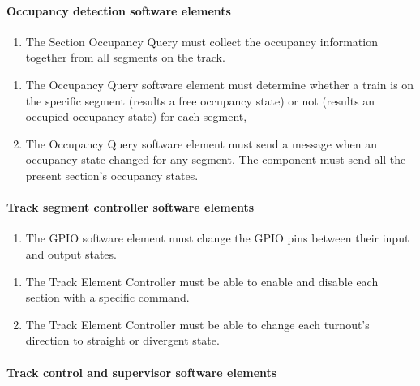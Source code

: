 \paragraph{Occupancy detection software elements}
\begin{enumerate}[label=REQ-SOQ-\arabic*, leftmargin=*, format=\small]
	\item The Section Occupancy Query must collect the occupancy information together from all segments on the track. \label{req:SOQ}
\end{enumerate}

\begin{enumerate}[label=REQ-OCQ-\arabic*, leftmargin=*, format=\small] 
	\item The Occupancy Query software element must determine whether a train is on the specific segment (results a free occupancy state) or not (results an occupied occupancy state) for each segment,  \label{req:OCQ-1}
	\item The Occupancy Query software element must send a message when an occupancy state changed for any segment. The component must send all the present section's occupancy states. \label{req:OCQ-2}
\end{enumerate}

\paragraph{Track segment controller software elements}
\begin{enumerate}[label=REQ-GPIO-\arabic*, leftmargin=*, format=\small] 
	\item The GPIO software element must change the GPIO pins between their input and output states. \label{req:GPIO}
\end{enumerate}

\begin{enumerate}[label=REQ-TEC-\arabic*, leftmargin=*, format=\small]
	\item The Track Element Controller must be able to enable and disable each section with a specific command. \label{req:TEC-1}
	\item The Track Element Controller must be able to change each turnout's direction to straight or divergent state. \label{req:TEC-2}
\end{enumerate}

\paragraph{Track control and supervisor software elements}

